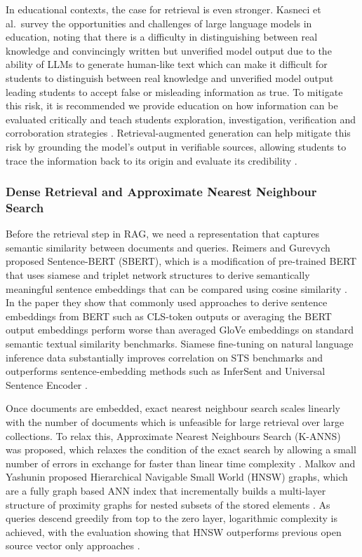 In educational contexts, the case for retrieval is even stronger. 
Kasneci et al.\ survey the opportunities and challenges of large language models in education, noting that there is a difficulty in distinguishing between real knowledge and convincingly written but unverified model output due to the ability of LLMs to generate human-like text which can make it difficult for students to distinguish between real knowledge and unverified model output leading students to accept false or misleading information as true. 
To mitigate this risk, it is recommended we provide education on how information can be evaluated critically and teach students exploration, investigation, verification and corroboration strategies \cite{kasneciChatGPTGoodOpportunities2023}.
Retrieval-augmented generation can help mitigate this risk by grounding the model's output in verifiable sources, allowing students to trace the information back to its origin and evaluate its credibility \cite{lewisRetrievalAugmentedGenerationKnowledgeIntensive2020,kasneciChatGPTGoodOpportunities2023}.

\subsubsection{Dense Retrieval and Approximate Nearest Neighbour Search}

Before the retrieval step in RAG, we need a representation that captures semantic similarity between documents and queries.
Reimers and Gurevych proposed Sentence-BERT (SBERT), which is a modification of pre-trained BERT that uses siamese and triplet network structures to derive semantically meaningful sentence embeddings that can be compared using cosine similarity \cite{reimersSentenceBERTSentenceEmbeddings2019}.
In the paper they show that commonly used approaches to derive sentence embeddings from BERT such as CLS-token outputs or averaging the BERT output embeddings perform worse than averaged GloVe embeddings on standard semantic textual similarity benchmarks. Siamese fine-tuning on natural language inference data substantially improves correlation on STS benchmarks and outperforms sentence-embedding methods such as InferSent and Universal Sentence Encoder \cite{reimersSentenceBERTSentenceEmbeddings2019}.

Once documents are embedded, exact nearest neighbour search scales linearly with the number of documents which is unfeasible for large retrieval over large collections.
To relax this, Approximate Nearest Neighbours Search (K-ANNS) was proposed, which relaxes the condition of the exact search by allowing a small number of errors in exchange for faster than linear time complexity \cite{malkovEfficientRobustApproximate2016}.
Malkov and Yashunin proposed Hierarchical Navigable Small World (HNSW) graphs, which are a fully graph based ANN index that incrementally builds a multi-layer structure of proximity graphs for nested subsets of the stored elements \cite{malkovEfficientRobustApproximate2016}.
As queries descend greedily from top to the zero layer, logarithmic complexity is achieved, with the evaluation showing that HNSW outperforms previous open source vector only approaches \cite{malkovEfficientRobustApproximate2016}.


